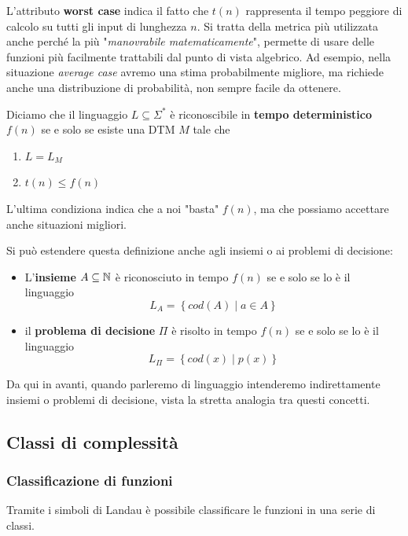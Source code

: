 L'attributo \textbf{worst case} indica il fatto che $t(n)$ rappresenta il tempo peggiore di calcolo su tutti gli input di lunghezza $n$. Si tratta della metrica più utilizzata anche perché la più "\textit{manovrabile matematicamente}", permette di usare delle funzioni più facilmente trattabili dal punto di vista algebrico. Ad esempio, nella situazione \textit{average case} avremo una stima probabilmente migliore, ma richiede anche una distribuzione di probabilità, non sempre facile da ottenere.

Diciamo che il linguaggio $L \subseteq \Sigma^\ast$ è riconoscibile in \textbf{tempo deterministico} $f(n)$ se e solo se esiste una DTM $M$ tale che
\begin{enumerate}
	\item $L= L_M$
    
	\item $t(n) \leq f(n)$
\end{enumerate}

L'ultima condiziona indica che a noi "basta" $f(n)$, ma che possiamo accettare anche situazioni migliori.

Si può estendere questa definizione anche agli insiemi o ai problemi di decisione:
\begin{itemize}
	\item L'\textbf{insieme} $A \subseteq \mathbb{N}$ è riconosciuto in tempo $f(n)$ se e solo se lo è il linguaggio
	$$ L_A = \left\{ cod (A) \mid a \in A \right\} $$
    
	\item il \textbf{problema di decisione} $\Pi$ è risolto in tempo $f(n)$ se e solo se lo è il linguaggio 
	$$ L_\Pi = \left\{cod(x) \mid p(x) \right\} $$
\end{itemize}

Da qui in avanti, quando parleremo di linguaggio intenderemo indirettamente insiemi o problemi di decisione, vista la stretta analogia tra questi concetti.

\subsection{Classi di complessità}

\subsubsection{Classificazione di funzioni}

Tramite i simboli di Landau è possibile classificare le funzioni in una serie di classi.

